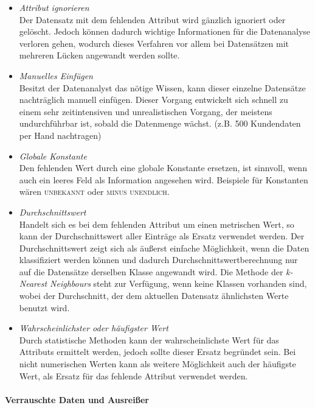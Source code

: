 \begin{itemize}
\item \textit{Attribut ignorieren}
\\ Der Datensatz mit dem fehlenden Attribut wird gänzlich ignoriert oder gelöscht. Jedoch können dadurch wichtige Informationen für die Datenanalyse verloren gehen, wodurch dieses Verfahren vor allem bei Datensätzen mit mehreren Lücken angewandt werden sollte.

\item \textit{Manuelles Einfügen}
\\ Besitzt der Datenanalyst das nötige Wissen, kann dieser einzelne Datensätze nachträglich manuell einfügen. Dieser Vorgang entwickelt sich schnell zu einem sehr zeitintensiven und unrealistischen Vorgang, der meistens undurchführbar ist, sobald die Datenmenge wächst. (z.B. 500 Kundendaten per Hand nachtragen)

\item \textit{Globale Konstante}
\\ Den fehlenden Wert durch eine globale Konstante ersetzen, ist sinnvoll, wenn auch ein leeres Feld als Information angesehen wird. Beispiele für Konstanten wären \textsc{unbekannt} oder \textsc{minus unendlich}.

\item \textit{Durchschnittswert}
\\ Handelt sich es bei dem fehlenden Attribut um einen metrischen Wert, so kann der Durchschnittswert aller Einträge als Ersatz verwendet werden. Der Durchschnittswert zeigt sich als äußerst einfache Möglichkeit, wenn die Daten klassifiziert werden können und dadurch Durchschnittswertberechnung nur auf die Datensätze derselben Klasse angewandt wird. Die Methode der \textit{k-Nearest Neighbours} steht zur Verfügung, wenn keine Klassen vorhanden sind, wobei der Durchschnitt, der dem aktuellen Datensatz ähnlichsten Werte benutzt wird.

\item \textit{Wahrscheinlichster oder häufigster Wert}
\\ Durch statistische Methoden kann der wahrscheinlichste Wert für das Attributs ermittelt werden, jedoch sollte dieser Ersatz begründet sein. Bei nicht numerischen Werten kann als weitere Möglichkeit auch der häufigste Wert, als Ersatz für das fehlende Attribut verwendet werden.
\end{itemize}

\paragraph{Verrauschte Daten und Ausreißer}

